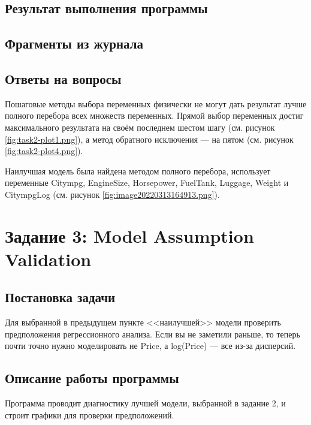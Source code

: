 \documentclass[12pt,a4paper]{article}
\begin{document}
  \subsection{Результат выполнения программы}

  \subsection{Фрагменты из журнала}

  \subsection{Ответы на вопросы}
  Пошаговые методы выбора переменных физически не могут дать результат лучше полного перебора всех множеств переменных.
  Прямой выбор переменных достиг максимального результата на своём последнем шестом шагу (см. рисунок \ref{fig:task2-plot1.png}),
  а метод обратного исключения --- на пятом (см. рисунок \ref{fig:task2-plot4.png}).

  Наилучшая модель была найдена методом полного перебора, использует переменные Citympg, EngineSize, Horsepower, FuelTank, Luggage, Weight и CitympgLog (см. рисунок \ref{fig:image20220313164913.png}).

  \newpage
  \section{Задание 3: Model Assumption Validation}
  \subsection{Постановка задачи}
  Для выбранной в предыдущем пункте <<наилучшей>> модели проверить предположения регрессионного анализа.
  Если вы не заметили раньше, то теперь почти точно нужно моделировать не Price, а log(Price) --- все из-за дисперсий.

  \subsection{Описание работы программы}
  Программа проводит диагностику лучшей модели, выбранной в задание 2, и строит графики для проверки предположений.
\end{document}
